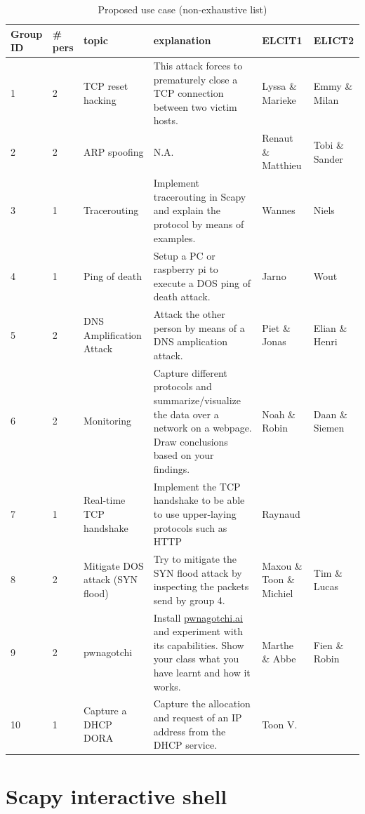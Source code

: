 \documentclass[11pt,a4paper]{article}
\begin{document}
\begin{table}[h!]
\centering
\renewcommand{\arraystretch}{1.3}
\caption{Proposed use case (non-exhaustive list)}%
\label{tab:use-cases}
\footnotesize
\begin{tabular}{@{}p{1cm} l p{2cm} p{5cm} p{2cm}p{2cm}@{}}
\toprule
Group ID &\# pers & topic & explanation & ELCIT1 & ELICT2 \\ \midrule
1&2       & TCP reset hacking     &  This attack forces to prematurely close a TCP connection between two victim hosts. & Lyssa \& Marieke  &   Emmy \& Milan        \\
2&2       & ARP spoofing      &   N.A.  & Renaut \& Matthieu & Tobi \& Sander       \\
3&1       & Tracerouting     & Implement tracerouting in Scapy and explain the protocol by means of examples.  & Wannes &  Niels       \\ 
4&1 & Ping of death & Setup a PC or raspberry pi to execute a DOS ping of death attack.& Jarno & Wout \\
5&2 & DNS Amplification Attack & Attack the other person by means of a DNS amplication attack. & Piet \& Jonas & Elian \& Henri\\
6&2 & Monitoring & Capture different protocols and summarize/visualize the data over a network on a webpage. Draw conclusions based on your findings. & Noah \& Robin & Daan \& Siemen\\
7&1 & Real-time TCP handshake & Implement the TCP handshake to be able to use upper-laying protocols such as HTTP & Raynaud &\\
8&2 & Mitigate DOS attack (SYN flood) & Try to mitigate the SYN flood attack by inspecting the packets send by group 4. & Maxou \& Toon \& Michiel & Tim \& Lucas\\
9 & 2 &pwnagotchi & Install \url{pwnagotchi.ai} and experiment with its capabilities. Show your class what you have learnt and how it works. & Marthe \& Abbe & Fien \& Robin \\
10&1& Capture a DHCP DORA & Capture the allocation and request of an IP address from the DHCP service. & Toon V.\\
\bottomrule
\end{tabular}%
\end{table}

\clearpage
\appendix
\section{Scapy interactive shell}\label{sec:scapy-interactive}
\end{document}
